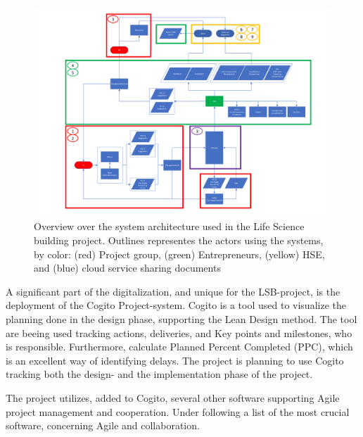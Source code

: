 \begin{figure}
    \centering
    \includegraphics[width=\textwidth]{fig/LVB_system-arkitektur.png}
    \caption{Overview over the system architecture used in the Life Science building project. Outlines representes the actors using the systems, by color: (red) Project group, (green) Entrepreneurs, (yellow) HSE, and (blue) cloud service sharing documents}
    \label{fig:LSB_systems}
\end{figure}

A significant part of the digitalization, and unique for the LSB-project, is the deployment of the Cogito Project-system. Cogito is a tool used to visualize the planning done in the design phase, supporting the Lean Design method. The tool are beeing used tracking actions, deliveries, and Key points and milestones, who is responsible. Furthermore, calculate Planned Percent Completed (PPC), which is an excellent way of identifying delays. The project is planning to use Cogito tracking both the design- and the implementation phase of the project.

The project utilizes, added to Cogito, several other software supporting Agile project management and cooperation. Under following a list of the most crucial software, concerning Agile and collaboration. 


